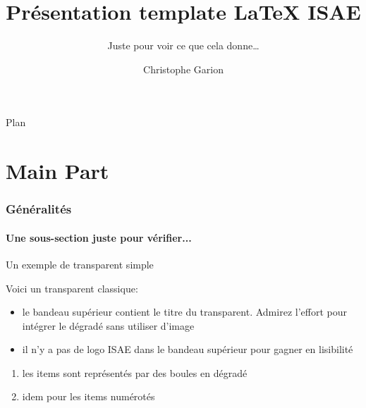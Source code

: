 \documentclass{beamer}
\begin{document}
\title[Template \LaTeX{} ISAE]{Présentation template \LaTeX{} ISAE}
\subtitle{Juste pour voir ce que cela donne\ldots}
\author{Christophe Garion}
\subject{Slides to present my beamer class for ISAE slides.}
\date{}

\begin{frame}{}
  \titlepage
\end{frame}

\begin{frame}{Plan}
  \tableofcontents[part=1,pausesections]
\end{frame}


\part<presentation>{Main Part}

\section{Généralités}
\label{sec:gen}

\subsection{Une sous-section juste pour vérifier...}
\label{sec:sub}

\begin{frame}{Un exemple de transparent simple}

\vfill

Voici un transparent classique:

\begin{itemize}
\item le bandeau supérieur contient le titre du transparent. Admirez
  l'effort pour intégrer le dégradé sans utiliser d'image \smiley
\item il n'y a pas de logo ISAE dans le bandeau supérieur pour gagner
  en lisibilité
\end{itemize}

\begin{enumerate}
\item les items sont représentés par des boules en dégradé
\item idem pour les items numérotés
\end{enumerate}

\vfill

\end{frame}
\end{document}
